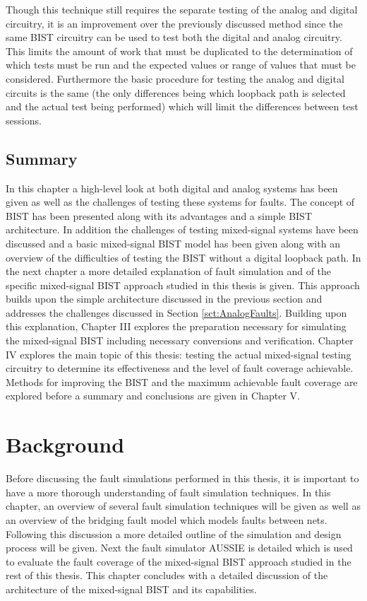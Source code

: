 \documentclass[12pt]{report}
\begin{document}
Though this technique still requires the separate testing of the analog and digital circuitry, it is an improvement over the previously discussed method since the same BIST circuitry can be used to test both the digital and analog circuitry\cite{stroud}.  This limits the amount of work that must be duplicated to the determination of which tests must be run and the expected values or range of values that must be considered.  Furthermore the basic procedure for testing the analog and digital circuits is the same (the only differences being which loopback path is selected and the actual test being performed) which will limit the differences between test sessions.

\section{Summary}
In this chapter a high-level look at both digital and analog systems has been given as well as the challenges of testing these systems for faults.  The concept of BIST has been presented along with its advantages and a simple BIST architecture.  In addition the challenges of testing mixed-signal systems have been discussed and a basic mixed-signal BIST model has been given along with an overview of the difficulties of testing the BIST without a digital loopback path.  In the next chapter a more detailed explanation of fault simulation and of the specific mixed-signal BIST approach studied in this thesis is given.  This approach builds upon the simple architecture discussed in the previous section and addresses the challenges discussed in Section \ref{sct:AnalogFaults}.  Building upon this explanation, Chapter III explores the preparation necessary for simulating the mixed-signal BIST including necessary conversions and verification.  Chapter IV explores the main topic of this thesis: testing the actual mixed-signal testing circuitry to determine its effectiveness and the level of fault coverage achievable.  Methods for improving the BIST and the maximum achievable fault coverage are explored before a summary and conclusions are given in Chapter V.

\chapter{Background}
Before discussing the fault simulations performed in this thesis, it is important to have a more thorough understanding of fault simulation techniques.  In this chapter, an overview of several fault simulation techniques will be given as well as an overview of the bridging fault model which models faults between nets.  Following this discussion a more detailed outline of the simulation and design process will be given.  Next the fault simulator AUSSIE is detailed which is used to evaluate the fault coverage of the mixed-signal BIST approach studied in the rest of this thesis.  This chapter concludes with a detailed discussion of the architecture of the mixed-signal BIST and its capabilities.
\end{document}
